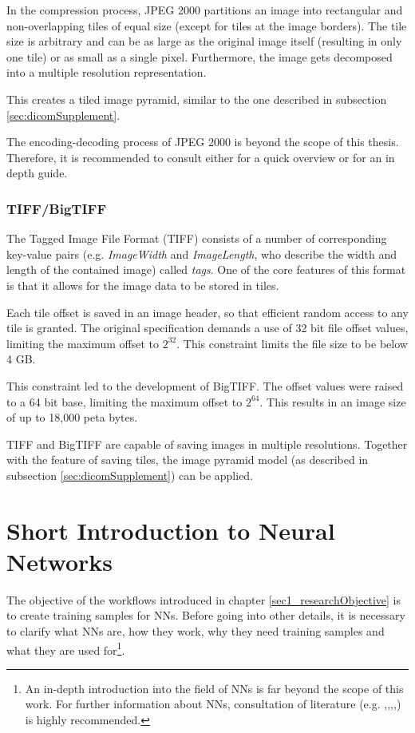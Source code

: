 In the compression process, JPEG 2000 partitions an image into rectangular and non-overlapping tiles of equal size (except for tiles at the image borders). The tile size is arbitrary and
can be as large as the original image itself (resulting in only one tile) or as small as a single pixel. Furthermore, the image gets decomposed into a multiple resolution representation\cite{Rabbani02}. 

This creates a tiled image pyramid, similar to the one described in subsection \ref{sec:dicomSupplement}.

The encoding-decoding process of JPEG 2000 is beyond the scope of this thesis. Therefore, it is recommended to consult either \cite{intoPix08} for a quick overview or \cite{Rabbani02} for an in depth guide.


\subsubsection{TIFF/BigTIFF}
The Tagged Image File Format (TIFF) consists of a number of corresponding key-value pairs (e.g. \emph{ImageWidth} and \emph{ImageLength}, who describe the width and length of the contained image) called \emph{tags}. One of the core features of this format is that it allows for the image data to be stored in tiles\cite{Eddins07}.

Each tile offset is saved in an image header, so that efficient random access to any tile is granted. The original specification demands a use of 32 bit file offset values, limiting the maximum offset to $2^{32}$. This constraint limits the file size to be below 4 GB\cite{Eddins07}.

This constraint led to the development of BigTIFF. The offset values were raised to a 64 bit base, limiting the maximum offset to $2^{64}$. This results in an image size of up to 18,000 peta bytes\cite{web:digitalpreservation}.

TIFF and BigTIFF are capable of saving images in multiple resolutions. Together with the feature of saving tiles, the image pyramid model (as described in subsection \ref{sec:dicomSupplement}) can be applied\cite{web:digitalpreservation2}. 


\section{Short Introduction to Neural Networks}
\label{sec2_introNN}
The objective of the workflows introduced in chapter \ref{sec1_researchObjective} is to create training samples for NNs. Before going into other details, it is necessary to clarify what NNs are, how they work, why they need training samples and what they are used for\footnote{
	An in-depth introduction into the field of NNs is far beyond the scope of this work. For further information about NNs, consultation of literature (e.g. \cite{Stergiou96},\cite{Bourg04},\cite{Egmont-Petersen02},\cite{Kriesel07},\cite{Shiffman12}) is highly recommended.}.

